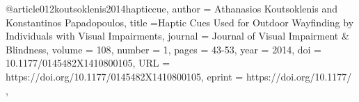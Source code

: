 @article{012koutsoklenis2014hapticcue,
author = {Athanasios Koutsoklenis and Konstantinos Papadopoulos},
title ={Haptic Cues Used for Outdoor Wayfinding by Individuals with Visual Impairments},
journal = {Journal of Visual Impairment \& Blindness},
volume = {108},
number = {1},
pages = {43-53},
year = {2014},
doi = {10.1177/0145482X1410800105},
URL = {https://doi.org/10.1177/0145482X1410800105},
eprint = { https://doi.org/10.1177/ },
}